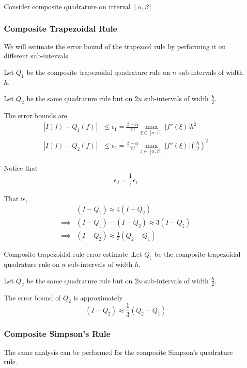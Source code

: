 \documentclass[12pt,letterpaper]{article}
\begin{document}
Consider composite quadrature on interval $[\alpha, \beta]$

\subsubsection{Composite Trapezoidal Rule}
We will estimate the error bound of the trapezoid rule by performing it on different sub-intervals.

Let $Q_1$ be the composite trapezoidal quadrature rule on $n$ sub-intervals of width $h$.

Let $Q_2$ be the same quadrature rule but on $2n$ sub-intervals of width $\frac{h}{2}$.

The error bounds are
\begin{align}
	\left| I(f) - Q_1(f) \right| &\leq \epsilon_1 = \frac{\beta-\alpha}{12} \max_{\xi \in [\alpha, \beta]} \big| f''(\xi) \big| h^2 \\
	\left| I(f) - Q_2(f) \right| &\leq \epsilon_2 = \frac{\beta-\alpha}{12} \max_{\xi \in [\alpha, \beta]} \big| f''(\xi) \big| \left( \frac{h}{2} \right)^2
\end{align}

Notice that
\begin{equation}
	\epsilon_2 = \frac{1}{4} \epsilon_1
\end{equation}

That is,
\begin{align}
	& ( I - Q_1 ) \approx 4 ( I - Q_2 ) \\
	\implies & ( I - Q_1 ) - ( I - Q_2) \approx 3 (I - Q_2) \\
	\implies & (I - Q_2) \approx \frac{1}{3} (Q_2 - Q_1)
\end{align}

\begin{theo}{Composite trapezoidal rule error estimate}
.Let $Q_1$ be the composite trapezoidal quadrature rule on $n$ sub-intervals of width $h$.

Let $Q_2$ be the same quadrature rule but on $2n$ sub-intervals of width $\frac{h}{2}$.

\medskip

The error bound of $Q_2$ is approximately
\begin{equation}
	(I - Q_2) \approx \frac{1}{3} (Q_2 - Q_1)
\end{equation}
\label{thm:comp_trap_error_est}
\end{theo}

\subsubsection{Composite Simpson's Rule}
The same analysis can be performed for the composite Simpson's quadrature rule.
\end{document}
